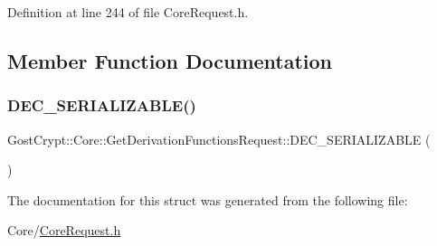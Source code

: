 Definition at line 244 of file Core\+Request.\+h.



\subsection{Member Function Documentation}
\mbox{\label{struct_gost_crypt_1_1_core_1_1_get_derivation_functions_request_a2929b5578d473aaff27754db5b12e251}} 
\subsubsection{\texorpdfstring{D\+E\+C\+\_\+\+S\+E\+R\+I\+A\+L\+I\+Z\+A\+B\+L\+E()}{DEC\_SERIALIZABLE()}}
{\footnotesize\ttfamily Gost\+Crypt\+::\+Core\+::\+Get\+Derivation\+Functions\+Request\+::\+D\+E\+C\+\_\+\+S\+E\+R\+I\+A\+L\+I\+Z\+A\+B\+LE (\begin{DoxyParamCaption}\item[{\hyperlink{struct_gost_crypt_1_1_core_1_1_get_derivation_functions_request}{Get\+Derivation\+Functions\+Request}}]{ }\end{DoxyParamCaption})}



The documentation for this struct was generated from the following file\+:\begin{DoxyCompactItemize}
\item 
Core/\hyperlink{_core_request_8h}{Core\+Request.\+h}\end{DoxyCompactItemize}
